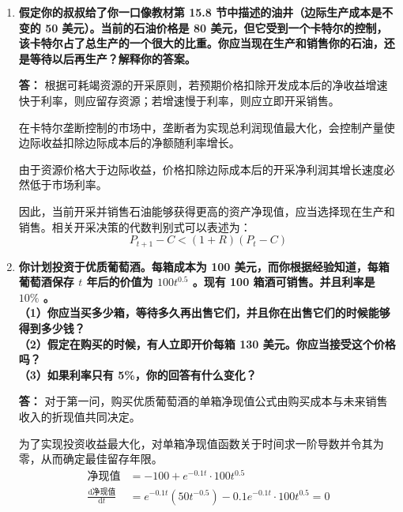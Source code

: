 \begin{enumerate}[label=\textbf{\arabic*.}, leftmargin=*]
		若拉尔夫选择直接参加工作，前三年与后三年分别获得不同阶梯的劳动报酬，期间不存在任何学费的流出。该直接就业决策路径的总现值 $\text{PDV}_2$ 计算为
		\[
		\begin{aligned}
			\text{PDV}_2 &= \sum_{t=1}^3 \frac{30000}{(1.1)^t} + \sum_{t=4}^6 \frac{45000}{(1.1)^t} \\
			&= 158683.95 \text{（美元）}
		\end{aligned}
		\]
		
		通过对两组跨期总现值进行比较，可以清晰地发现直接参加工作的财富现值显著更高
		\[
		\text{PDV}_2 > \text{PDV}_1
		\]
		攻读研究生不仅需要支付高昂的直接学费，更造成了高额的早期误工机会成本。在高利率环境下，早期的现金流入具有更高的权重，因此从纯粹的金融投资视角来看，读研究生并不是一项明智的经济决策。
		\newpage
		\item \textbf{假定你的叔叔给了你一口像教材第 15.8 节中描述的油井（边际生产成本是不变的 50 美元）。当前的石油价格是 80 美元，但它受到一个卡特尔的控制，该卡特尔占了总生产的一个很大的比重。你应当现在生产和销售你的石油，还是等待以后再生产？解释你的答案。}
		
		\textbf{答：}
		根据可耗竭资源的开采原则，若预期价格扣除开发成本后的净收益增速快于利率，则应留存资源；若增速慢于利率，则应立即开采销售。
		
		在卡特尔垄断控制的市场中，垄断者为实现总利润现值最大化，会控制产量使边际收益扣除边际成本后的净额随利率增长。
		
		由于资源价格大于边际收益，价格扣除边际成本后的开采净利润其增长速度必然低于市场利率。
		
		因此，当前开采并销售石油能够获得更高的资产净现值，应当选择现在生产和销售。相关开采决策的代数判别式可以表述为：
		\[
		P_{t+1} - C < (1 + R)(P_t - C)
		\]
		
		\item \textbf{你计划投资于优质葡萄酒。每箱成本为 100 美元，而你根据经验知道，每箱葡萄酒保存 $t$ 年后的价值为 $100t^{0.5}$ 。现有 100 箱酒可销售。并且利率是 $10\%$ 。\\（1）你应当买多少箱，等待多久再出售它们，并且你在出售它们的时候能够得到多少钱？\\（2）假定在购买的时候，有人立即开价每箱 130 美元。你应当接受这个价格吗？\\（3）如果利率只有 5\%，你的回答有什么变化？}
		
		\textbf{答：}
		对于第一问，购买优质葡萄酒的单箱净现值公式由购买成本与未来销售收入的折现值共同决定。
		
		为了实现投资收益最大化，对单箱净现值函数关于时间求一阶导数并令其为零，从而确定最佳留存年限。
		\[
		\begin{aligned}
			\text{净现值} &= -100 + e^{-0.1t} \cdot 100t^{0.5} \\
			\frac{\text{d}\text{净现值}}{\text{d}t} &= e^{-0.1t} \left(50t^{-0.5}\right) - 0.1e^{-0.1t} \cdot 100t^{0.5} = 0
		\end{aligned}
		\]
		

\end{enumerate}
